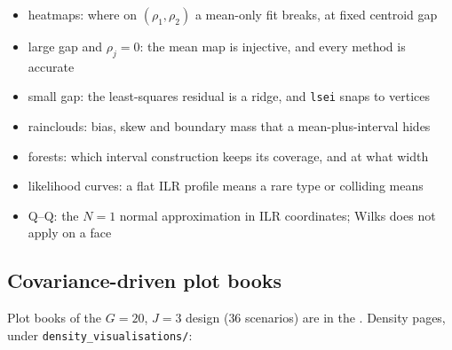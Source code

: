 \begin{itemize}
  \item heatmaps: where on \((\rho_{1},\rho_{2})\) a mean-only fit breaks, at fixed centroid gap
  \item large gap and \(\rho_{j}=0\): the mean map is injective, and every method is accurate
  \item small gap: the least-squares residual is a ridge, and \texttt{lsei} snaps to vertices
  \item rainclouds: bias, skew and boundary mass that a mean-plus-interval hides
  \item forests: which interval construction keeps its coverage, and at what width
  \item likelihood curves: a flat ILR profile means a rare type or colliding means
  \item Q--Q: the \(N=1\) normal approximation in ILR coordinates; Wilks does not apply on a face
        \cite{wilksLargeSampleDistributionLikelihood1938,selfAsymptoticPropertiesMaximum1987}
\end{itemize}

\subsection{Covariance-driven plot books}
\label{app:fig03}

Plot books of the \(G=20\), \(J=3\) design (\(36\) scenarios) are in the
.
Density pages, under \texttt{density\_visualisations/}:

